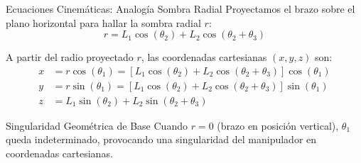 \documentclass[aspectratio=169,11pt]{beamer}
\begin{document}
\begin{frame}{Ecuaciones Cinemáticas: Analogía Sombra Radial}
    Proyectamos el brazo sobre el plano horizontal para hallar la sombra radial $r$:
    \begin{equation}
        r = L_1\cos(\theta_2) + L_2\cos(\theta_2 + \theta_3)
    \end{equation}
    
    A partir del radio proyectado $r$, las coordenadas cartesianas $(x, y, z)$ son:
    \begin{align}
        x &= r\cos(\theta_1) = \left[ L_1\cos(\theta_2) + L_2\cos(\theta_2 + \theta_3) \right]\cos(\theta_1) \\
        y &= r\sin(\theta_1) = \left[ L_1\cos(\theta_2) + L_2\cos(\theta_2 + \theta_3) \right]\sin(\theta_1) \\
        z &= L_1\sin(\theta_2) + L_2\sin(\theta_2 + \theta_3)
    \end{align}
    
    \begin{block}{Singularidad Geométrica de Base}
        Cuando $r = 0$ (brazo en posición vertical), $\theta_1$ queda indeterminado, provocando una singularidad del manipulador en coordenadas cartesianas.
    \end{block}
\end{frame}
\end{document}
